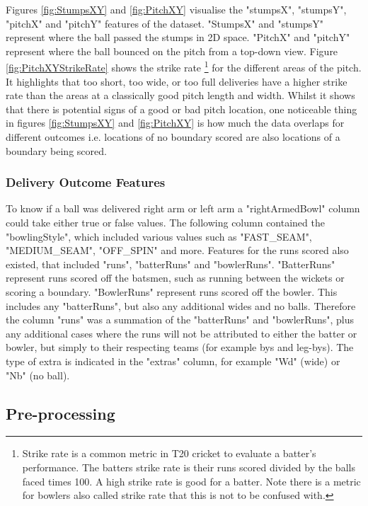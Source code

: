 \documentclass[12pt,a4paper]{report}
\theoremstyle{definition}
\begin{document}
Figures \ref{fig:StumpsXY} and \ref{fig:PitchXY} visualise the "stumpsX", "stumpsY", "pitchX" and "pitchY" features of the dataset. 
"StumpsX" and "stumpsY" represent where the ball passed the stumps in 2D space.
"PitchX" and "pitchY" represent where the ball bounced on the pitch from a top-down view.
Figure \ref{fig:PitchXYStrikeRate} shows the strike rate \footnote{Strike rate is a common metric in T20 cricket to evaluate a batter's performance. The batters strike rate is their runs scored divided by the balls faced times 100. A high strike rate is good for a batter. Note there is a metric for bowlers also called strike rate that this is not to be confused with.} for the different areas of the pitch. 
It highlights that too short, too wide, or too full deliveries have a higher strike rate than the areas at a classically good pitch length and width.
Whilst it shows that there is potential signs of a good or bad pitch location, one noticeable thing in figures \ref{fig:StumpsXY} and \ref{fig:PitchXY} is how much the data overlaps for different outcomes i.e. locations of no boundary scored are also locations of a boundary being scored.

\subsubsection{Delivery Outcome Features}

To know if a ball was delivered right arm or left arm a "rightArmedBowl" column could take either true or false values.
The following column contained the "bowlingStyle", which included various values such as "FAST\_SEAM", "MEDIUM\_SEAM",  "OFF\_SPIN" and more.
Features for the runs scored also existed, that included "runs", "batterRuns" and "bowlerRuns". 
"BatterRuns" represent runs scored off the batsmen, such as running between the wickets or scoring a boundary.
"BowlerRuns" represent runs scored off the bowler. 
This includes any "batterRuns", but also any additional wides and no balls.
Therefore the column "runs" was a summation of the "batterRuns" and "bowlerRuns", plus any additional cases where the runs will not be attributed to either the batter or bowler, but simply to their respecting teams (for example bys and leg-bys).
The type of extra is indicated in the "extras" column, for example "Wd" (wide) or "Nb" (no ball).

\subsection{Pre-processing}
\end{document}
